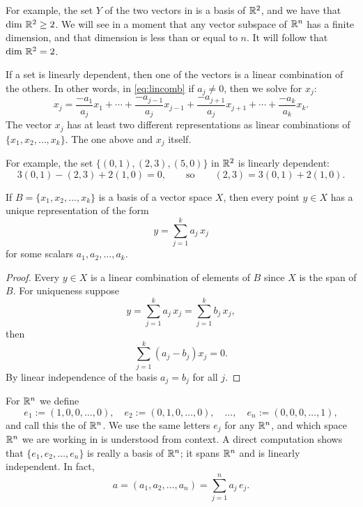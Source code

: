 For example, the
set $Y$ of the two vectors in
 is a basis of ${\mathbb{R}}^2$, and we have
that $\dim \, {\mathbb{R}}^2 \geq 2$.
We will see in a moment that any vector subspace of ${\mathbb{R}}^n$
has a finite dimension, and that dimension is less than or equal to $n$.
It will follow that $\dim \, {\mathbb{R}}^2 = 2$.

If a set is linearly dependent, then one of the
vectors is a linear combination of the others.  In other words, in
\eqref{eq:lincomb}
if $a_j \not= 0$, then we solve for $x_j$:
\begin{equation*}
x_j = \frac{-a_1}{a_j} x_1 + \cdots + 
\frac{-a_{j-1}}{a_j} x_{j-1} +
\frac{-a_{j+1}}{a_j} x_{j+1} +
\cdots + 
\frac{-a_k}{a_k} x_k .
\end{equation*}
The vector $x_j$ has at least two different representations
as linear combinations of $\{ x_1,x_2,\ldots,x_k \}$. The one above and
$x_j$ itself. 

For example, the set $\bigl\{ (0,1), (2,3), (5,0) \bigr\}$ in ${\mathbb{R}}^2$ is linearly dependent:
\begin{equation*}
3(0,1) - (2,3) + 2(1,0) = 0 ,
\qquad \text{so} \qquad
(2,3) = 3(0,1) + 2(1,0) .
\end{equation*}

\begin{prop}
If $B = \{ x_1, x_2, \ldots, x_k \}$ is a basis of a vector space $X$, then
every point $y \in X$ has a unique representation of the form
\begin{equation*}
y = \sum_{j=1}^k a_j \, x_j
\end{equation*}
for some scalars $a_1, a_2, \ldots, a_k$.
\end{prop}

\begin{proof}
Every $y \in X$ is a linear combination of elements of $B$
since $X$ is the span of $B$.  For uniqueness
suppose
\begin{equation*}
y = \sum_{j=1}^k a_j \, x_j = \sum_{j=1}^k b_j \, x_j ,
\end{equation*}
then
\begin{equation*}
\sum_{j=1}^k (a_j-b_j) x_j = 0 .
\end{equation*}
By linear independence of the basis $a_j = b_j$ for all $j$.
\end{proof}

For ${\mathbb{R}}^n$
we define
\begin{equation*}
e_1 := (1,0,0,\ldots,0) , \quad
e_2 := (0,1,0,\ldots,0) , \quad \ldots, \quad
e_n := (0,0,0,\ldots,1) ,
\end{equation*}
and call this the \emph{} of ${\mathbb{R}}^n$.
We use the same letters $e_j$ for any ${\mathbb{R}}^n$, and
which space ${\mathbb{R}}^n$ we are working in is understood from context.
A direct computation shows that $\{ e_1, e_2, \ldots, e_n \}$ is really
a basis of ${\mathbb{R}}^n$; it spans ${\mathbb{R}}^n$ and is
linearly independent.  In fact,
\begin{equation*}
a = (a_1,a_2,\ldots,a_n) = \sum_{j=1}^n a_j \, e_j .
\end{equation*}

